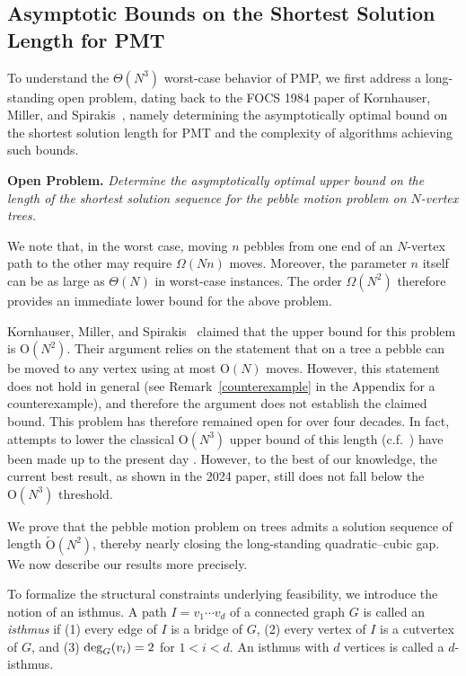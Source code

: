 \documentclass[letter,11pt]{article}
\theoremstyle{definition}
\theoremstyle{definition}
\newcommand{\1}{\boldmath$~1~$\unboldmath}
\newcommand{\Ord}{\mathrm{O}}
\begin{document}
\subsection{Asymptotic Bounds on the Shortest Solution Length for PMT}


To understand the $\Theta(N^3)$ worst-case behavior of PMP,
we first address a long-standing open problem, 
dating back to the FOCS 1984 paper of Kornhauser, Miller, and Spirakis~\cite{715921},
namely determining the asymptotically optimal bound on the
shortest solution length for PMT and the complexity of
algorithms achieving such bounds.

\noindent
{\bf{Open Problem.}} {\it Determine the asymptotically optimal upper bound 
on the length of the shortest solution sequence for the pebble motion problem
on $N$-vertex trees.}



We note that, in the worst case, moving $n$ pebbles from one end of an $N$-vertex path to the other may require $\Omega(Nn)$ moves. 
Moreover, the parameter $n$ itself can be as large as $\Theta(N)$ in worst-case instances. 
The order $\Omega(N^2)$ therefore provides an immediate lower bound for the above problem.

Kornhauser, Miller, and Spirakis~\cite{715921} claimed that the upper bound
for this problem is $\Ord(N^2)$.
Their argument relies on the statement that on a tree
a pebble can be moved to any vertex using at most $\Ord(N)$ moves.
However, this statement does not hold in general
(see Remark~\ref{counterexample} in the Appendix for a counterexample),
and therefore the argument does not establish the claimed bound.
This problem has therefore remained open for over four decades.
In fact, attempts to lower the classical $\Ord(N^3)$ upper bound of this length 
(c.f.~\cite{WOS:000077614700003}) have been made up to the present day
\cite{WOS:000077614700003, 
WOS:001177663400002}. 
However, to the best of our knowledge, the current best result, as shown in the 2024 
paper\cite{WOS:001177663400002}, still does not fall below the $\Ord(N^3)$ threshold.

We prove that the pebble motion problem on trees
admits a solution sequence of length $\tilde{\Ord}(N^2)$,
thereby nearly closing the long-standing quadratic--cubic gap.
We now describe our results more precisely.

To formalize the structural constraints underlying feasibility,
we introduce the notion of an isthmus. 
A path $I=v_1 \cdots v_d$ of a connected graph $G$ is called an \textit{isthmus} if 
(1) every edge of $I$ is a bridge of $G$, 
(2) every vertex of $I$ is a cutvertex of $G$, and
(3) ${\rm deg}_G (v_i)=2$ for $1 < i < d$.
An isthmus with $d$ vertices is called a $d$-isthmus.
\end{document}
